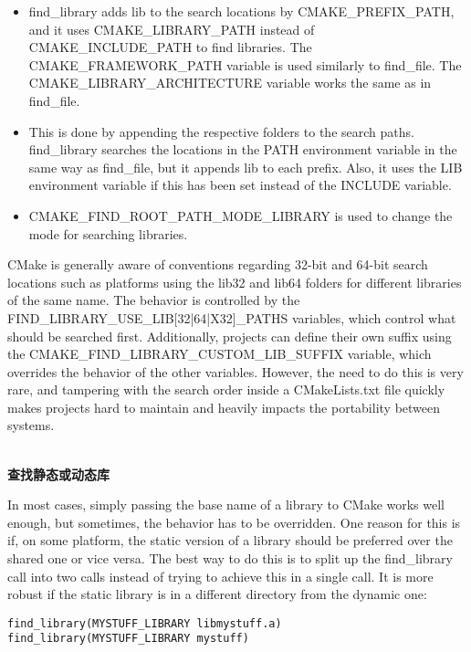 \begin{itemize}
\item 
find\_library adds lib to the search locations by CMAKE\_PREFIX\_PATH, and it uses CMAKE\_LIBRARY\_PATH instead of CMAKE\_INCLUDE\_PATH to find libraries. The CMAKE\_FRAMEWORK\_PATH variable is used similarly to find\_file. The CMAKE\_LIBRARY\_ARCHITECTURE variable works the same as in find\_file.

\item 
This is done by appending the respective folders to the search paths. find\_library searches the locations in the PATH environment variable in the same way as find\_file, but it appends lib to each prefix. Also, it uses the LIB environment variable if this has been set instead of the INCLUDE variable.

\item 
CMAKE\_FIND\_ROOT\_PATH\_MODE\_LIBRARY is used to change the mode for searching libraries.
\end{itemize}

CMake is generally aware of conventions regarding 32-bit and 64-bit search locations such as platforms using the lib32 and lib64 folders for different libraries of the same name. The behavior is controlled by the FIND\_LIBRARY\_USE\_LIB[32|64|X32]\_PATHS variables, which control what should be searched first. Additionally, projects can define their own suffix using the CMAKE\_FIND\_LIBRARY\_CUSTOM\_LIB\_SUFFIX variable, which overrides the behavior of the other variables. However, the need to do this is very rare, and tampering with the search order inside a CMakeLists.txt file quickly makes projects hard to maintain and heavily impacts the portability between systems.

\hspace*{\fill} \\ %
\noindent
\textbf{查找静态或动态库}

In most cases, simply passing the base name of a library to CMake works well enough, but sometimes, the behavior has to be overridden. One reason for this is if, on some platform, the static version of a library should be preferred over the shared one or vice versa. The best way to do this is to split up the find\_library call into two calls instead of trying to achieve this in a single call. It is more robust if the static library is in a different directory from the dynamic one:

\begin{lstlisting}[style=styleCMake]
find_library(MYSTUFF_LIBRARY libmystuff.a)
find_library(MYSTUFF_LIBRARY mystuff)
\end{lstlisting}

